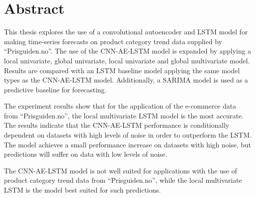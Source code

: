 \section*{Abstract}
\label{section:Abstract}





This thesis explores the use of a convolutional autoencoder and LSTM model for making time-series
forecasts on product category trend data supplied by ``Prisguiden.no''.
The use of the CNN-AE-LSTM model is expanded by applying a local univariate, global univariate, local univariate and global multivariate model.
Results are compared with an LSTM baseline model applying the same model types as the CNN-AE-LSTM model.
Additionally, a SARIMA model is used as a predictive baseline for forecasting.


The experiment results show that for the application of the e-commerce data from ``Prisguiden.no'',
the local multivariate LSTM model is the most accurate.
The results indicate that the CNN-AE-LSTM performance is conditionally dependent on datasets with high levels of noise in order to outperform the LSTM.
The model achieves a small performance increase on datasets with high noise, but predictions will suffer
on data with low levels of noise.

The CNN-AE-LSTM model is not well suited for applications with the use of product category trend data from ``Prisguiden.no'',
while the local multivariate LSTM is the model best suited for such predictions.







